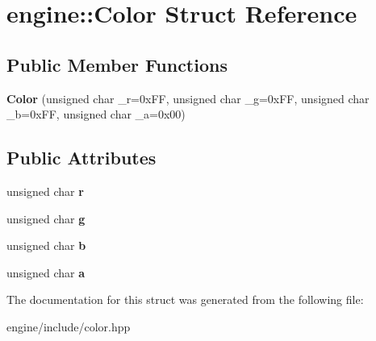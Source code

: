 \hypertarget{structengine_1_1_color}{}\section{engine\+:\+:Color Struct Reference}
\label{structengine_1_1_color}
\subsection*{Public Member Functions}
\begin{DoxyCompactItemize}
\item 
{\bfseries Color} (unsigned char \+\_\+r=0x\+F\+F, unsigned char \+\_\+g=0x\+F\+F, unsigned char \+\_\+b=0x\+F\+F, unsigned char \+\_\+a=0x00)\hypertarget{structengine_1_1_color_a67e8c3592c2b20d569d584290b3a46f5}{}\label{structengine_1_1_color_a67e8c3592c2b20d569d584290b3a46f5}

\end{DoxyCompactItemize}
\subsection*{Public Attributes}
\begin{DoxyCompactItemize}
\item 
unsigned char {\bfseries r}\hypertarget{structengine_1_1_color_a08ba023e4c9d21443e6952d9525264f0}{}\label{structengine_1_1_color_a08ba023e4c9d21443e6952d9525264f0}

\item 
unsigned char {\bfseries g}\hypertarget{structengine_1_1_color_a866656b8ccdaf7d833289387e9a0d587}{}\label{structengine_1_1_color_a866656b8ccdaf7d833289387e9a0d587}

\item 
unsigned char {\bfseries b}\hypertarget{structengine_1_1_color_aae7001ad7a437fa8a680a967b3ff4e90}{}\label{structengine_1_1_color_aae7001ad7a437fa8a680a967b3ff4e90}

\item 
unsigned char {\bfseries a}\hypertarget{structengine_1_1_color_a423894c1c93e0601ac7709e78341baab}{}\label{structengine_1_1_color_a423894c1c93e0601ac7709e78341baab}

\end{DoxyCompactItemize}


The documentation for this struct was generated from the following file\+:\begin{DoxyCompactItemize}
\item 
engine/include/color.\+hpp\end{DoxyCompactItemize}
